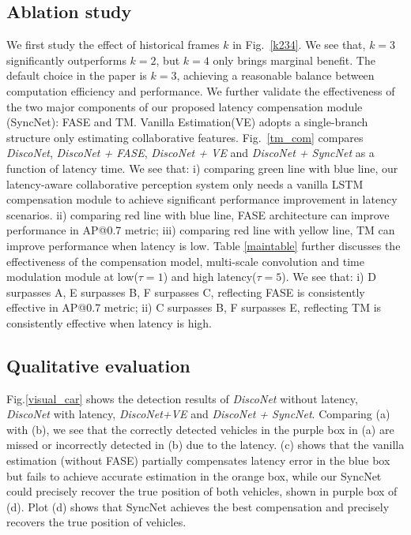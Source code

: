 \documentclass[runningheads]{llncs}
\begin{document}
\subsection{Ablation study}
We first study the effect of historical frames $k$ in Fig.~\ref{k234}. We see that, $k=3$ significantly outperforms $k=2$, but $k=4$ only brings marginal benefit. The default choice in the paper is $k=3$, achieving a reasonable balance between computation efficiency and performance. 
We further validate the effectiveness of the two major components of our proposed latency compensation module (SyncNet): FASE and TM. Vanilla Estimation(VE) adopts a single-branch structure only estimating collaborative features. Fig.~\ref{tm_com} compares \textit{DiscoNet}, \textit{DiscoNet + FASE}, \textit{DiscoNet + VE} and \textit{DiscoNet + SyncNet} as a function of latency time. We see  that: i) comparing green line with blue line, our latency-aware collaborative perception system only needs a vanilla LSTM compensation module to achieve significant performance improvement in latency scenarios. ii) comparing red line with blue line, FASE architecture can improve performance in AP@0.7 metric; iii) comparing red line with yellow line, TM can improve performance when latency is low.
Table \ref{maintable} further discusses the effectiveness of the compensation model, multi-scale convolution and time modulation module at low($\tau = 1$) and high latency($\tau = 5$). We see that: i) D surpasses A, E surpasses B, F surpasses C,  reflecting FASE is consistently effective in AP@0.7 metric; ii) C surpasses B, F surpasses E, reflecting TM is consistently effective when latency is high. 

\subsection{Qualitative evaluation}

Fig.\ref{visual_car} shows the detection results of \textit{DiscoNet} without latency, \textit{DiscoNet} with latency, \textit{DiscoNet+VE} and \textit{DiscoNet + SyncNet}. Comparing (a) with (b), we see that the correctly detected vehicles in the purple box in (a) are missed or incorrectly detected in (b) due to the latency. (c) shows that the vanilla estimation (without FASE) partially compensates latency error in the blue box but fails to achieve accurate estimation in the orange box, while our SyncNet could precisely recover the true position of both vehicles, shown in purple box of (d). Plot (d) shows that SyncNet achieves the best compensation and precisely recovers the true position of vehicles.
\end{document}
